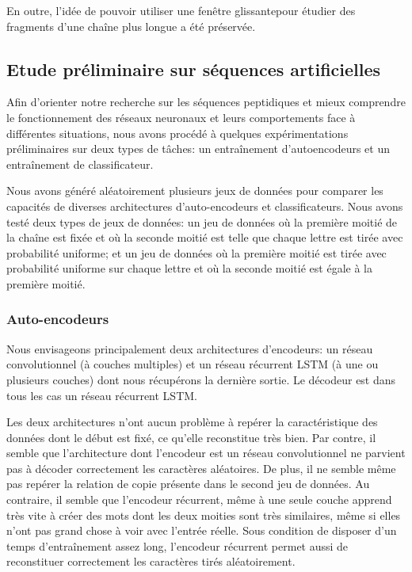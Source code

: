 \documentclass[a4paper, 11pt, onecolumn]{article}
\begin{document}
En outre, l'idée de pouvoir utiliser une \og fenêtre glissante\fg pour étudier
des fragments d'une chaîne plus longue a été préservée.

\subsection{Etude préliminaire sur séquences artificielles}

Afin d'orienter notre recherche sur les séquences peptidiques et mieux comprendre le fonctionnement des réseaux neuronaux et leurs
comportements face à différentes situations, nous avons procédé à quelques
expérimentations préliminaires sur deux types de tâches: un entraînement
d'autoencodeurs et un entraînement de classificateur.

Nous avons généré aléatoirement plusieurs jeux de données pour comparer les
capacités de diverses architectures d'auto-encodeurs et classificateurs. Nous
avons testé deux types de jeux de données: un jeu de données où la première
moitié de la chaîne est fixée et où la seconde moitié est telle que chaque
lettre est tirée avec probabilité uniforme; et un jeu de données où la première
moitié est tirée avec probabilité uniforme sur chaque lettre et où la seconde
moitié est égale à la première moitié.

\subsubsection{Auto-encodeurs}

Nous envisageons principalement deux architectures d'encodeurs: un réseau
convolutionnel (à couches multiples) et un réseau récurrent LSTM (à une ou plusieurs
couches) dont nous récupérons la dernière sortie. Le décodeur est dans tous les
cas un réseau récurrent LSTM.

Les deux architectures n'ont aucun problème à repérer la caractéristique des données dont le
début est fixé, ce qu'elle reconstitue très bien. Par contre, il semble que l'architecture dont l'encodeur est un
réseau convolutionnel ne parvient pas à décoder correctement les caractères
aléatoires. De plus, il ne semble même pas repérer la relation de \og copie\fg
présente dans le second jeu de données. Au contraire, il semble que l'encodeur
récurrent, même à une seule couche apprend très vite à créer des mots dont les
deux moities sont très similaires, même si elles n'ont pas grand chose à voir
avec l'entrée réelle. Sous condition de disposer d'un temps d'entraînement assez
long, l'encodeur récurrent permet aussi de reconstituer correctement les
caractères tirés aléatoirement.
\end{document}
